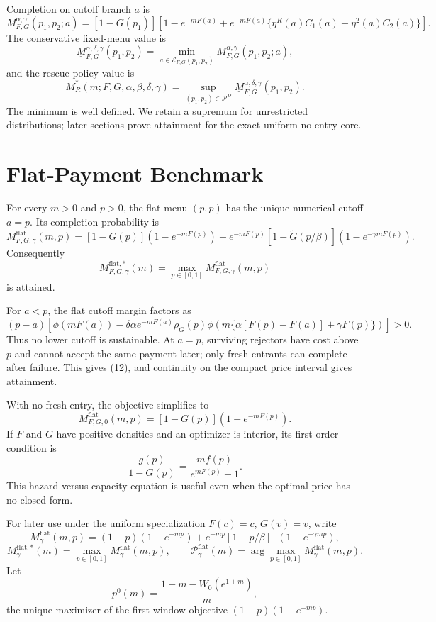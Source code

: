 \documentclass[mnsc,blindrev]{informs3}
\newcommand{\calE}{\mathcal E}
\newcommand{\ph}{\phi}
\begin{document}
Completion on cutoff branch \(a\) is
\[
 M_{F,G}^{\alpha,\gamma}(p_1,p_2;a)
 =[1-G(p_1)]\left[1-e^{-mF(a)}+e^{-mF(a)}
 \{\eta^R(a)C_1(a)+\eta^2(a)C_2(a)\}\right].              \tag{9}
\]
The conservative fixed-menu value is
\[
 \underline M_{F,G}^{\alpha,\delta,\gamma}(p_1,p_2)
 =\min_{a\in\calE_{F,G}(p_1,p_2)}
 M_{F,G}^{\alpha,\gamma}(p_1,p_2;a),                      \tag{10}
\]
and the rescue-policy value is
\[
 M_R^*(m;F,G,\alpha,\beta,\delta,\gamma)
 =\sup_{(p_1,p_2)\in\mathcal P^D}
 \underline M_{F,G}^{\alpha,\delta,\gamma}(p_1,p_2).      \tag{11}
\]
The minimum is well defined.  We retain a supremum for unrestricted
distributions; later sections prove attainment for the exact uniform
no-entry core.
\section{Flat-Payment Benchmark}
\label{sec:flat}

\begin{proposition}
\label{prop:flat}
For every \(m>0\) and \(p>0\), the flat menu \((p,p)\) has the unique
numerical cutoff \(a=p\).  Its completion probability is
\[
 M^{\mathrm{flat}}_{F,G,\gamma}(m,p)
 =[1-G(p)](1-e^{-mF(p)})
 +e^{-mF(p)}[1-\widetilde G(p/\beta)]
  (1-e^{-\gamma mF(p)}).                                  \tag{12}
\]
Consequently
\[
 M^{\mathrm{flat},*}_{F,G,\gamma}(m)
 =\max_{p\in[0,1]}M^{\mathrm{flat}}_{F,G,\gamma}(m,p)     \tag{13}
\]
is attained.
\end{proposition}

For \(a<p\), the flat cutoff margin factors as
\[
 (p-a)\left[\ph(mF(a))-\delta\alpha e^{-mF(a)}
 \rho_G(p)\ph\!\left(m\{\alpha[F(p)-F(a)]+\gamma F(p)\}\right)\right]>0.
\]
Thus no lower cutoff is sustainable.  At \(a=p\), surviving rejectors have
cost above \(p\) and cannot accept the same payment later; only fresh entrants
can complete after failure.  This gives (12), and continuity on the compact
price interval gives attainment.

With no fresh entry, the objective simplifies to
\[
 M^{\mathrm{flat}}_{F,G,0}(m,p)
 =[1-G(p)](1-e^{-mF(p)}).                                 \tag{F3}
\]
If \(F\) and \(G\) have positive densities and an optimizer is interior, its
first-order condition is
\[
 \frac{g(p)}{1-G(p)}
 =\frac{mf(p)}{e^{mF(p)}-1}.                              \tag{F4}
\]
This hazard-versus-capacity equation is useful even when the optimal price has
no closed form.

For later use under the uniform specialization \(F(c)=c\), \(G(v)=v\), write
\[
 M_\gamma^{\mathrm{flat}}(m,p)
 =(1-p)(1-e^{-mp})
 +e^{-mp}[1-p/\beta]^+(1-e^{-\gamma mp}),
\]
\[
 M_\gamma^{\mathrm{flat},*}(m)
 =\max_{p\in[0,1]}M_\gamma^{\mathrm{flat}}(m,p),\qquad
 \mathcal P_\gamma^{\mathrm{flat}}(m)
 =\arg\max_{p\in[0,1]}M_\gamma^{\mathrm{flat}}(m,p).
\]
Let
\[
 p^0(m)=\frac{1+m-W_0(e^{1+m})}{m},                       \tag{F1}
\]
the unique maximizer of the first-window objective
\((1-p)(1-e^{-mp})\).
\end{document}
